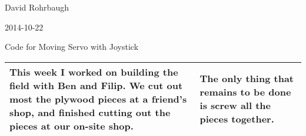 David Rohrbaugh

2014-10-22

Code for Moving Servo with Joystick

\begin{tabular}{|p{5cm}|p{5cm}|}
 \hline
 This week I worked on building the field with Ben and Filip. We cut out most the plywood pieces at a friend's shop, and finished cutting out the pieces at our on-site shop.
 &
 The only thing that remains to be done is screw all the pieces together.
 \\
 \hline
\end{tabular}
